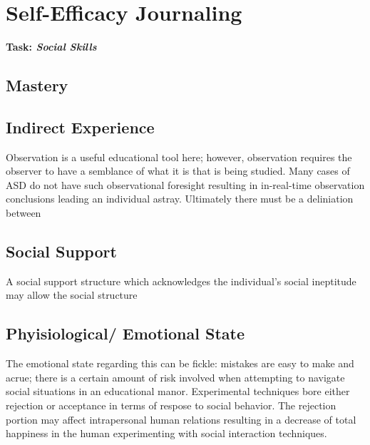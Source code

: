 \documentclass{article}
\begin{document}

\section{Self-Efficacy Journaling}

\textbf{Task: \textit{Social Skills}}

\subsection{Mastery}

\subsection{Indirect Experience}
Observation is a useful educational tool here; however, observation requires the observer to have a semblance of what it is that is being studied. Many cases of ASD do not  have such observational foresight resulting in in-real-time observation conclusions leading an individual astray. Ultimately there must be a deliniation between 

\subsection{Social Support}
A social support structure which acknowledges the individual's social ineptitude may allow the social structure 
\subsection{Phyisiological/ Emotional State}

The emotional state regarding this can be fickle: mistakes are easy to make and acrue; there is a certain amount of risk involved when attempting to navigate social situations in an educational manor. Experimental techniques bore either rejection or acceptance in terms of respose to social behavior. The rejection portion may affect intrapersonal human relations resulting in a decrease of total happiness in the human experimenting with social interaction techniques. 


\end{document}
